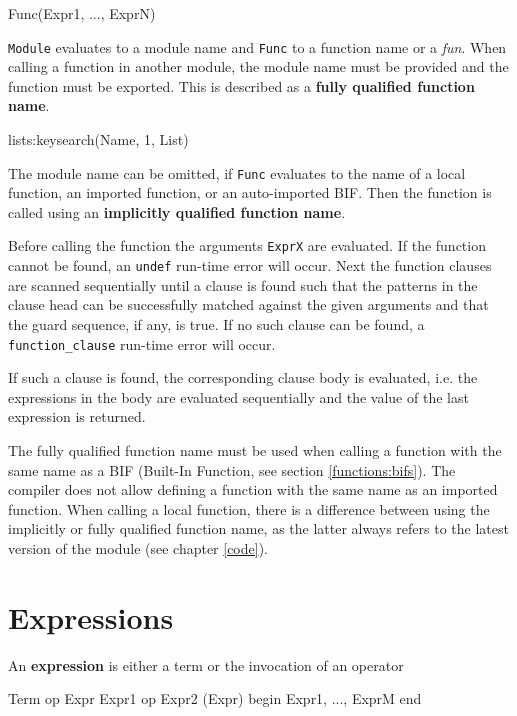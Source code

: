 \begin{erlang}
[Module:]Func(Expr1, ..., ExprN)
\end{erlang}

\texttt{Module} evaluates to a module name and \texttt{Func} to
a function name or a \textit{fun}. When calling a function in another
module, the module name must be provided and the function must be
exported. This is described as a \textbf{fully qualified function
  name}.

\begin{erlang}
lists:keysearch(Name, 1, List)
\end{erlang}

The module name can be omitted, if \texttt{Func} evaluates to the name
of a local function, an imported function, or an auto-imported
BIF. Then the function is called using an \textbf{implicitly qualified
  function name}.

Before calling the function the arguments \texttt{ExprX} are
evaluated. If the function cannot be found, an \texttt{undef} run-time
error will occur. Next the function clauses are scanned sequentially
until a clause is found such that the patterns in the clause head can
be successfully matched against the given arguments and that the guard
sequence, if any, is true. If no such clause can be found, a
\texttt{function\_clause} run-time error will occur.

If such a clause is found, the corresponding clause body is evaluated,
i.e. the expressions in the body are evaluated sequentially and the
value of the last expression is returned.

The fully qualified function name must be used when calling a function
with the same name as a BIF (Built-In Function, see section
\ref{functions:bifs}). The compiler does not allow defining a function
with the same name as an imported function. When calling a local
function, there is a difference between using the implicitly or fully
qualified function name, as the latter always refers to the latest
version of the module (see chapter \ref{code}).


\section{Expressions}
An \textbf{expression} is either a term or the invocation of an
operator

\begin{erlang}
Term
op Expr
Expr1 op Expr2
(Expr)
begin
   Expr1,
   ...,
   ExprM            %
end

\end{erlang}

